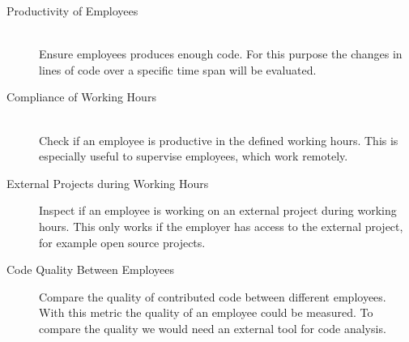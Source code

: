 \begin{description}
    \item[Productivity of Employees] \hfill \\
        Ensure employees produces enough code.
        For this purpose the changes in lines of code over a specific time span will be evaluated.

    \item[Compliance of Working Hours] \hfill \\
        Check if an employee is productive in the defined working hours.
        This is especially useful to supervise employees, which work remotely.

    \item[External Projects during Working Hours] \hfill
        Inspect if an employee is working on an external project during working hours.
        This only works if the employer has access to the external project, for example open source projects.

    \item[Code Quality Between Employees] \hfill
        Compare the quality of contributed code between different employees.
        With this metric the quality of an employee could be measured.
        To compare the quality we would need an external tool for code analysis.
\end{description}


